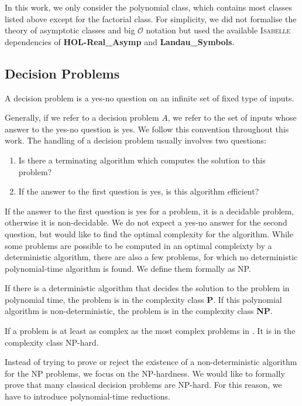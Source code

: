 In this work, we only consider the polynomial class, which contains most classes listed above 
except for the factorial class. For simplicity, we did not 
formalise the theory of asymptotic classes and big $\mathcal{O}$ notation but used the 
available \textsc{Isabelle} dependencies of \textbf{HOL-Real\_Asymp} and \textbf{Landau\_Symbols}.

\subsection*{Decision Problems}
\begin{definition}
    A decision problem is a yes-no question on an infinite set of fixed type of inputs.
\end{definition}
Generally, if we refer to a decision problem $A$, we refer to the set of inputs whose answer to the yes-no question is yes. 
We follow this convention throughout this work.
The handling of a decision problem usually involves two questions:
\begin{enumerate}
    \item Is there a terminating algorithm which computes the solution to this problem?
    \item If the answer to the first question is yes, is this algorithm efficient?
\end{enumerate}
If the answer to the first question is yes for a problem, it is a decidable problem, otherwise it is non-decidable. 
We do not expect a yes-no answer for the second question, but would like to find 
the optimal complexity for the algorithm. While some problems are possible to be computed in 
an optimal compleixty by a deterministic algorithm, there are also a few problems, for which 
no deterministic polynomial-time algorithm is found. We define them formally as NP.
\begin{definition}
    If there is a deterministic algorithm that decides the solution 
    to the problem in polynomial time, the problem is in the complexity class \textbf{P}.
    If this polynomial algorithm is non-deterministic, the problem is in the complexity class \textbf{NP}. 
\end{definition}
\begin{definition}
If a problem is at least as complex as the most complex problems in \NP. It is 
    in the complexity class NP-hard.
\end{definition}

Instead of trying to prove or reject the existence of a non-deterministic algorithm 
for the NP problems, we focus on the NP-hardness. We would like to formally prove 
that many classical decision problems are NP-hard. For this reason, we have to introduce polynomial-time reductions.

